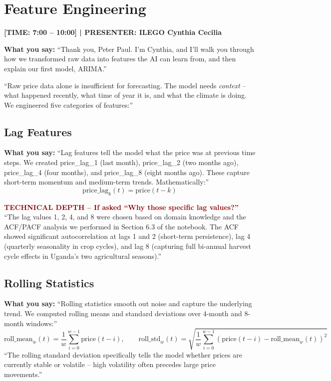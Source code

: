 \documentclass[11pt,a4paper]{article}
\begin{document}
\newpage
\section{Feature Engineering}
\textcolor{timecolor}{\textbf{[TIME: 7:00 -- 10:00] | PRESENTER: ILEGO Cynthia Cecilia}}

\textbf{What you say:}
``Thank you, Peter Paul. I'm Cynthia, and I'll walk you through how we transformed raw data into features the AI can learn from, and then explain our first model, ARIMA.''

``Raw price data alone is insufficient for forecasting. The model needs \textit{context} -- what happened recently, what time of year it is, and what the climate is doing. We engineered five categories of features:''

\subsection{Lag Features}
\textbf{What you say:}
``Lag features tell the model what the price was at previous time steps. We created price\_lag\_1 (last month), price\_lag\_2 (two months ago), price\_lag\_4 (four months), and price\_lag\_8 (eight months ago). These capture short-term momentum and medium-term trends. Mathematically:''
$$\text{price\_lag}_k(t) = \text{price}(t - k)$$

\begin{mdframed}[backgroundcolor=red!5, linecolor=darkred]
\textcolor{darkred}{\textbf{TECHNICAL DEPTH -- If asked ``Why those specific lag values?''}}\\
``The lag values 1, 2, 4, and 8 were chosen based on domain knowledge and the ACF/PACF analysis we performed in Section 6.3 of the notebook. The ACF showed significant autocorrelation at lags 1 and 2 (short-term persistence), lag 4 (quarterly seasonality in crop cycles), and lag 8 (capturing full bi-annual harvest cycle effects in Uganda's two agricultural seasons).''
\end{mdframed}

\subsection{Rolling Statistics}
\textbf{What you say:}
``Rolling statistics smooth out noise and capture the underlying trend. We computed rolling means and standard deviations over 4-month and 8-month windows:''
$$\text{roll\_mean}_w(t) = \frac{1}{w}\sum_{i=0}^{w-1} \text{price}(t-i), \qquad \text{roll\_std}_w(t) = \sqrt{\frac{1}{w}\sum_{i=0}^{w-1}(\text{price}(t-i) - \text{roll\_mean}_w(t))^2}$$
``The rolling standard deviation specifically tells the model whether prices are currently stable or volatile -- high volatility often precedes large price movements.''
\end{document}
